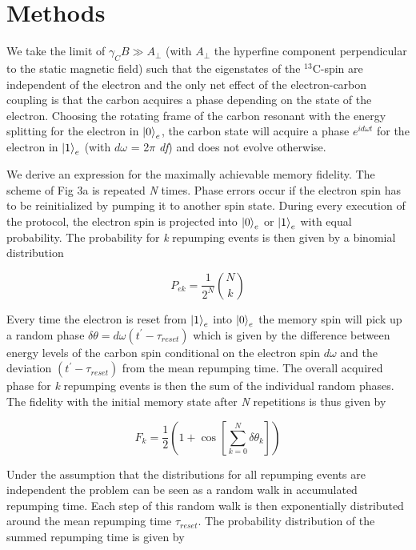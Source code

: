 \section{Methods}
We take the limit of $\gamma_C B \gg A_{\perp}$ (with $A_{\perp}$  the hyperfine component perpendicular to the static magnetic field) such that the eigenstates of the $^{13}$C-spin are independent of the electron and the only net effect of the electron-carbon coupling is that the carbon acquires a phase depending on the state of the electron. Choosing the rotating frame of the carbon resonant with the energy splitting for the electron in $\left|0\right>_e$, the carbon state will acquire a phase $e^{id\omega t}$ for the electron in $\left|1\right>_e$ (with $d \omega$ = 2$\pi$ \textit{df}) and does not evolve otherwise.

We derive an expression for the maximally achievable memory fidelity. The scheme of Fig 3a is repeated \textit{N} times. Phase errors occur if the electron spin has to be reinitialized by pumping it to another spin state. During every execution of the protocol, the electron spin is projected into $\left|0\right>_e$ or $\left|1\right>_e$ with equal probability. The probability for \textit{k} repumping events is then given by a binomial distribution

\begin{equation}
P_{ek} = \frac{1}{2^N}\binom{N}{k}
\end{equation}

Every time the electron is reset from $\left|1\right>_e$ into $\left|0\right>_e$ the memory spin will pick up a random phase $\delta \theta = d \omega (t^{\prime} - \tau_{reset})$ which is given by the difference between energy levels of the carbon spin conditional on the electron spin $d \omega$ and the deviation $(t^{\prime} - \tau_{reset})$ from the mean repumping time. The overall acquired phase for \textit{k}  repumping events is then the sum of the individual random phases. The fidelity with the initial memory state after \textit{N} repetitions is thus given by

\begin{equation}
F_k = \frac{1}{2}\left(1+\cos \left[\sum_{k=0}^N \delta \theta_k\right]\right)
\end{equation}

Under the assumption that the distributions for all repumping events are independent the problem can be seen as a random walk in accumulated repumping time. Each step of this random walk is then exponentially distributed around the mean repumping time $\tau_{reset}$. The probability distribution of the summed repumping time is given by\cite{Akkouchi_CCMS_2008}

